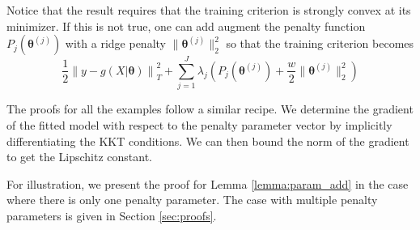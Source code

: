 \documentclass[12pt]{article}
\begin{document}
Notice that the result requires that the training criterion is strongly convex at its minimizer. If this is not true, one can add augment the penalty function $P_j(\boldsymbol{\theta}^{(j)})$ with a ridge penalty $\| \boldsymbol{\theta}^{(j)} \|_2^2$ so that the training criterion becomes
\begin{equation}
\label{eq:param_add_models_ridge}
\frac{1}{2} \left  \| y -  g(X| \boldsymbol{\theta}) \right \|^2_T 
+ \sum_{j=1}^J \lambda_j \left ( P_j(\boldsymbol{\theta}^{(j)}) + \frac{w}{2} \| \boldsymbol{\theta}^{(j)} \|^2_2 \right )
\end{equation}


The proofs for all the examples follow a similar recipe. We determine the gradient of the fitted model with respect to the penalty parameter vector by implicitly differentiating the KKT conditions. We can then bound the norm of the gradient to get the Lipschitz constant.


For illustration, we present the proof for Lemma \ref{lemma:param_add} in the case where there is only one penalty parameter. The case with multiple penalty parameters is given in Section \ref{sec:proofs}.
\end{document}
